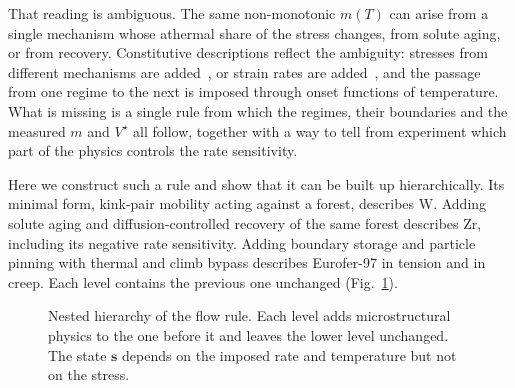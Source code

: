 \documentclass[aps,prl,twocolumn,superscriptaddress,amsmath,amssymb,floatfix]{revtex4-2}
\newcommand{\gd}{\dot\gamma}
\newcommand{\ts}{\tau^{\star}}
\begin{document}
That reading is ambiguous. The same non-monotonic $m(T)$ can arise from a single mechanism whose athermal share of the stress changes, from solute aging, or from recovery. Constitutive descriptions reflect the ambiguity: stresses from different mechanisms are added~\cite{Seeger,KocksArgonAshby,EstrinMcCormick}, or strain rates are added~\cite{FrostAshby}, and the passage from one regime to the next is imposed through onset functions of temperature. What is missing is a single rule from which the regimes, their boundaries and the measured $m$ and $V^\star$ all follow, together with a way to tell from experiment which part of the physics controls the rate sensitivity.

Here we construct such a rule and show that it can be built up hierarchically. Its minimal form, kink-pair mobility acting against a forest, describes W. Adding solute aging and diffusion-controlled recovery of the same forest describes Zr, including its negative rate sensitivity. Adding boundary storage and particle pinning with thermal and climb bypass describes Eurofer-97 in tension and in creep. Each level contains the previous one unchanged (Fig.~\ref{fig:scheme}).

\begin{figure}[b]
\centering
{}
\caption{Nested hierarchy of the flow rule. Each level adds microstructural physics to the one before it and leaves the lower level unchanged. The state $\bm s$ depends on the imposed rate and temperature but not on the stress.}
\label{fig:scheme}
\end{figure}
\end{document}
